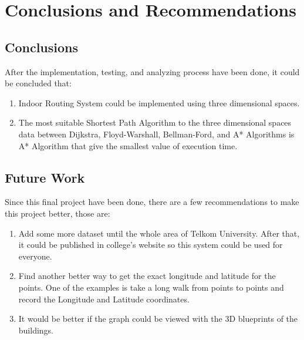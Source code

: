 \chapter{Conclusions and Recommendations}
\section{Conclusions}
After the implementation, testing, and analyzing process have been done, it could be concluded that:
\begin{enumerate}
	\item Indoor Routing System could be implemented using three dimensional spaces.
	\item The most suitable Shortest Path Algorithm to the three dimensional spaces data between Dijkstra, Floyd-Warshall, Bellman-Ford, and A* Algorithms is A* Algorithm that give the smallest value of execution time.
	  
\end{enumerate}
\section{Future Work}
Since this final project have been done, there are a few recommendations to make this project better, those are:
\begin{enumerate}
	\item Add some more dataset until the whole area of Telkom University. After that, it could be published in college's website so this system could be used for everyone.
	\item Find another better way to get the exact longitude and latitude for the points. One of the examples is take a long walk from points to points and record the Longitude and Latitude coordinates.
	\item It would be better if the graph could be viewed with the 3D blueprints of the buildings. 
\end{enumerate}
